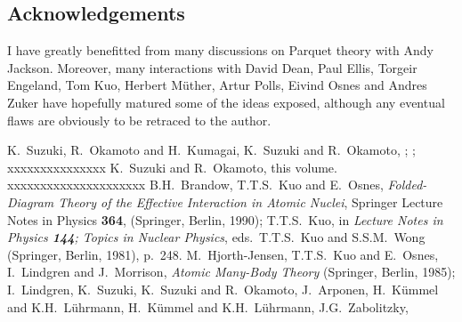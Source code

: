 \subsection*{Acknowledgements}
I have greatly benefitted from many discussions on Parquet theory with
Andy Jackson. Moreover, many interactions with David Dean, Paul Ellis,
Torgeir Engeland, Tom Kuo, Herbert M\"uther, Artur Polls, Eivind Osnes
and Andres Zuker have hopefully matured some of the ideas exposed,
although any eventual flaws are obviously to be retraced to the
author.

\begin{thebibliography}{200}
 K.\ Suzuki, R.\ Okamoto and H.\ Kumagai, 
K.\ Suzuki and R.\ Okamoto, 
;
;
xxxxxxxxxxxxxxx K.\ Suzuki and R.\ Okamoto, this volume. xxxxxxxxxxxxxxxxxxxxx
 B.H.\ Brandow, 
 T.T.S.\ Kuo and E.\ Osnes, {\em Folded-Diagram Theory
of the Effective Interaction in Atomic Nuclei}, Springer Lecture
Notes in Physics {\bf 364}, (Springer, Berlin, 1990); 
T.T.S.\ Kuo, in {\em Lecture Notes in
Physics {\bf 144}; Topics in Nuclear Physics}, eds.\ T.T.S.\ Kuo and S.S.M.\
Wong (Springer, Berlin, 1981), p.\ 248.
 M.\ Hjorth-Jensen, T.T.S.\ Kuo and E.\ Osnes,
\Journal{\PRep}{261}{125}{1995}
  I.\ Lindgren and J.\ Morrison, 
{\em Atomic Many-Body Theory}
(Springer, Berlin, 1985); I.\ Lindgren, 
 K.\ Suzuki, 
K.\ Suzuki and R.\ Okamoto, 
 J.\ Arponen, 
 H.\ K\"{u}mmel and K.H.\ L\"{u}hrmann, 
 H.\ K\"{u}mmel and K.H.\ L\"{u}hrmann, 
 J.G.\ Zabolitzky, 

\end{thebibliography}

